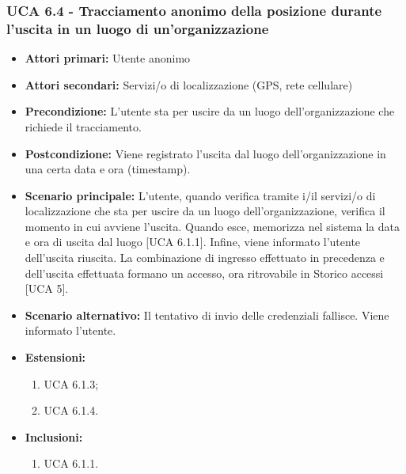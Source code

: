 \subsubsection{UCA 6.4 - Tracciamento anonimo della posizione durante l'uscita in un luogo di un'organizzazione}
\begin{itemize}
	\item \textbf{Attori primari:} Utente anonimo
	\item \textbf{Attori secondari:} Servizi/o di localizzazione (GPS, rete cellulare)
	\item \textbf{Precondizione:} L'utente sta per uscire da un luogo dell'organizzazione che richiede il tracciamento.
	\item \textbf{Postcondizione:} Viene registrato l'uscita dal luogo dell'organizzazione in una certa data e ora (timestamp).
	\item \textbf{Scenario principale:} L'utente, quando verifica tramite i/il servizi/o di localizzazione che sta per uscire da un luogo dell'organizzazione, verifica il momento in cui avviene l'uscita. Quando esce, memorizza nel sistema la data e ora di uscita dal luogo [UCA 6.1.1]. Infine, viene informato l'utente dell'uscita riuscita. La combinazione di ingresso effettuato in precedenza e dell'uscita effettuata formano un accesso, ora ritrovabile in Storico accessi [UCA 5].
	\item \textbf{Scenario alternativo:} Il tentativo di invio delle credenziali fallisce. Viene informato l'utente.
	\item \textbf{Estensioni:}
	\begin{enumerate}
		\item UCA 6.1.3;
		\item UCA 6.1.4.
	\end{enumerate}
	\item \textbf{Inclusioni:}
	\begin{enumerate}
		\item UCA 6.1.1.
	\end{enumerate}
\end{itemize}